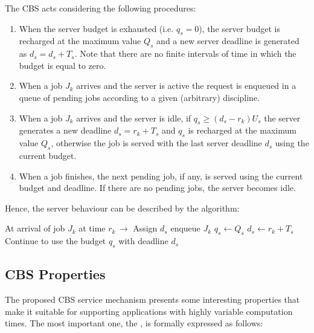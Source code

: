 The CBS acts considering the following procedures:
\begin{enumerate}
    \item When the server budget is exhausted (i.e. $q_s = 0$), the server budget is recharged at the maximum value $Q_s$ and a new server deadline is generated as $d_s = d_s + T_s$. Note that there are no finite intervals of time in which the budget is equal to zero.
    \item When a job $J_k$ arrives and the server is active the request is enqueued in a queue of pending jobs according to a given (arbitrary) discipline.
    \item When a job $J_k$ arrives and the server is idle, if $q_s \ge (d_s - r_k) U_s$ the server generates a new deadline $d_s = r_k + T_s$ and $q_s$ is recharged at the maximum value $Q_s$, otherwise the job is served with the last server deadline $d_s$ using the current budget.
    \item When a job finishes, the next pending job, if any, is served using the current budget and deadline. If there are no pending jobs, the server becomes idle.
\end{enumerate}

Hence, the server behaviour can be described by the algorithm:
\begin{algorithm}
    \begin{algorithmic}
        \STATE At arrival of job $J_k$ at time $r_k\,\rightarrow$ Assign $d_s$ 
        \STATE enqueue $J_k$
        \ELSE
        \STATE $q_s \leftarrow Q_s$       %
        \STATE $d_s \leftarrow r_k + T_s$ %
        \ELSE
        \STATE Continue to use the budget $q_s$ with deadline $d_s$
        \ENDIF
        \ENDIF
    \end{algorithmic}
\end{algorithm}


\subsection{CBS Properties}
The proposed CBS service mechanism presents some interesting properties that make it suitable for supporting applications with highly variable computation times. The most important one, the , is formally expressed as follows:


